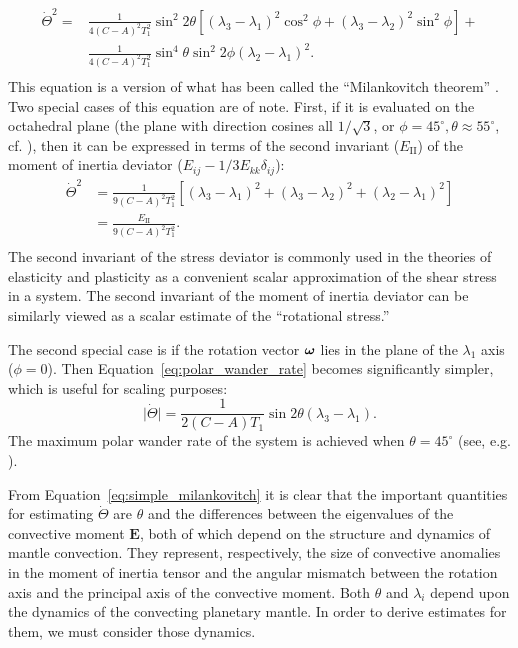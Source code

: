 \documentclass[extra,mreferee]{gji}
\begin{document}
\begin{equation}
\begin{aligned}
\dot{\Theta}^2 = 
&\frac{1}{4(C-A)^2 T_1^2}\sin^2{2\theta} \left[( \lambda_3 - \lambda_1)^2 \cos^2{\phi} + (\lambda_3 - \lambda_2)^2 \sin^2{\phi} \right] +\\
&\frac{1}{4(C-A)^2 T_1^2}\sin^4{\theta} \sin^2{2\phi}\left( \lambda_2 - \lambda_1 \right)^2. \\
\label{eq:polar_wander_rate}
\end{aligned}
\end{equation}
This equation is a version of what has been called the ``Milankovitch theorem'' \citep{munk1960rotation}.
Two special cases of this equation are of note. First, if it is evaluated on the octahedral plane
(the plane with direction cosines all $1/\sqrt{3}$, or $\phi=45^\circ, \theta\approx 55^\circ$, cf. \citet{fung1965foundations}), 
then it can be expressed in terms of the second invariant ($E_{\mathrm{II}}$) of the moment of inertia deviator 
($E_{ij} - 1/3 E_{kk} \delta_{ij}$):
\begin{equation}
\begin{aligned}
\dot{\Theta}^2
&= \frac{1}{9(C-A)^2 T_1^2}\left[( \lambda_3 - \lambda_1)^2 + (\lambda_3 - \lambda_2)^2 + (\lambda_2 - \lambda_1)^2 \right]\\
&= \frac{E_{\mathrm{II}}}{9(C-A)^2 T_1^2}. \\
\end{aligned}
\end{equation}
The second invariant of the stress deviator is commonly used in the theories of elasticity and plasticity
as a convenient scalar approximation of the shear stress in a system.
The second invariant of the moment of inertia deviator can be similarly viewed as a scalar estimate of the ``rotational stress.''

The second special case is if the rotation vector $\mitbf{\omega}$ lies in the plane of the $\lambda_1$ axis ($\phi = 0$).
Then Equation~\eqref{eq:polar_wander_rate} becomes significantly simpler, which is useful for scaling purposes:
\begin{equation}
\vert \dot{\Theta} \vert = 
\frac{1}{2(C-A) T_1}\sin{2\theta} ( \lambda_3 - \lambda_1).
\label{eq:simple_milankovitch}
\end{equation}
The maximum polar wander rate of the system is achieved when $\theta=45^\circ$ (see, e.g. \citet{fung1965foundations}).

From Equation~\eqref{eq:simple_milankovitch} it is clear that the important quantities for estimating $\dot{\Theta}$ are $\theta$ and the differences between the eigenvalues of the convective moment $\mathbf{E}$, both of which depend on the structure and dynamics of mantle convection.  
They represent, respectively, the size of convective anomalies in the moment of inertia tensor and the angular mismatch between the rotation axis and the principal axis of the convective moment.
Both $\theta$ and $\lambda_i$ depend upon the dynamics of the convecting planetary mantle.
In order to derive estimates for them, we must consider those dynamics.
\end{document}
